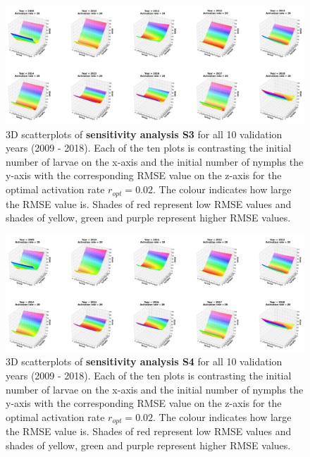 \documentclass[a4paper, 11pt]{scrartcl}
\begin{document}
\begin{figure}
\centering
\includegraphics[width=\linewidth]{figures/independent_initial_ticks_with_beech_error.png}
\caption{3D scatterplots of \textbf{sensitivity analysis S3} for all 10 validation years (2009 - 2018). Each of the ten plots is contrasting the initial number of larvae on the
x-axis and the initial number of nymphs the y-axis with the corresponding RMSE value on the z-axis for the optimal activation rate $r_{opt} = 0.02$. The colour indicates how large
the RMSE value is. Shades of red represent low RMSE values and shades of yellow, green and purple represent higher RMSE values.}
\label{fig:independent_initial_ticks_with_beech_error_rotated}
\end{figure}

\begin{figure}
\centering
\includegraphics[width=\linewidth]{figures/independent_initial_ticks_without_beech_error.png}
\caption{3D scatterplots of \textbf{sensitivity analysis S4} for all 10 validation years (2009 - 2018). Each of the ten plots is contrasting the initial number of larvae on the
x-axis and the initial number of nymphs the y-axis with the corresponding RMSE value on the z-axis for the optimal activation rate $r_{opt} = 0.02$. The colour indicates how large
the RMSE value is. Shades of red represent low RMSE values and shades of yellow, green and purple represent higher RMSE values.}
\label{fig:independent_initial_ticks_without_beech_error_rotated}
\end{figure}
\end{document}
